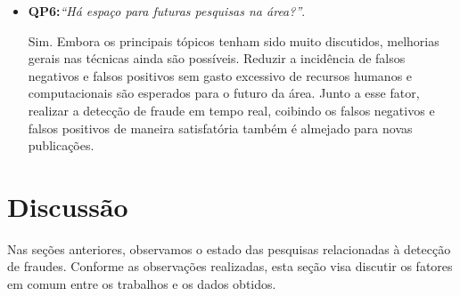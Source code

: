 \documentclass[smallextended]{svjour3}
\begin{document}
\begin{itemize}
	\
	\item \textbf{QP6:}\textit{“Há espaço para futuras pesquisas na área?”}.
	
	Sim. Embora os principais tópicos tenham sido muito discutidos, melhorias gerais nas técnicas ainda são possíveis. Reduzir a incidência de falsos negativos e falsos positivos sem gasto excessivo de recursos humanos e computacionais são esperados para o futuro da área. Junto a esse fator, realizar a detecção de fraude em tempo real, coibindo os falsos negativos e falsos positivos de maneira satisfatória também é almejado para novas publicações.
	
\end{itemize}

\section{Discussão}
\label{sec:5}

Nas seções anteriores, observamos o estado das pesquisas relacionadas à detecção de fraudes. Conforme as observações realizadas, esta seção visa discutir os fatores em comum entre os trabalhos e os dados obtidos.
\end{document}

